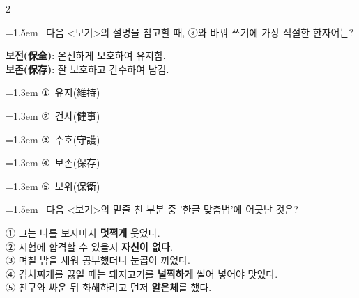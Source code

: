 \documentclass[10pt, a4paper]{article}
\begin{document}
\begin{multicols}{2}
\noindent\begin{minipage}{\columnwidth}
\vspace{2mm}
{\hangindent=1.5em  ~다음 <보기>의 설명을 참고할 때, ⓐ와 바꿔 쓰기에 가장 적절한 한자어는?\par}

\vspace{1mm}
\begin{boxibox}
\textbf{보전(保全)}: 온전하게 보호하여 유지함. \\
\textbf{보존(保存)}: 잘 보호하고 간수하여 남김. \\
\end{boxibox}
\vspace{1mm}

\vspace{0.5mm}
{\hangindent=1.3em  \noindent\hspace{0.3em}①~유지(維持)\par}
{\hangindent=1.3em  \noindent\hspace{0.3em}②~건사(健事)\par}
{\hangindent=1.3em  \noindent\hspace{0.3em}③~수호(守護)\par}
{\hangindent=1.3em  \noindent\hspace{0.3em}④~보존(保存)\par}
{\hangindent=1.3em  \noindent\hspace{0.3em}⑤~보위(保衛)\par}
\vspace{4mm}
\end{minipage}
\par

\noindent\begin{minipage}{\columnwidth}
\vspace{2mm}
{\hangindent=1.5em  ~다음 <보기>의 밑줄 친 부분 중 '한글 맞춤법'에 어긋난 것은?\par}

\vspace{1mm}
\begin{boxibox}
① 그는 나를 보자마자 \textbf{멋쩍게} 웃었다. \\
② 시험에 합격할 수 있을지 \textbf{자신이 없다}. \\
③ 며칠 밤을 새워 공부했더니 \textbf{눈곱}이 끼었다. \\
④ 김치찌개를 끓일 때는 돼지고기를 \textbf{널찍하게} 썰어 넣어야 맛있다. \\
⑤ 친구와 싸운 뒤 화해하려고 먼저 \textbf{알은체}를 했다. \\
\end{boxibox}
\vspace{1mm}


\end{minipage}
\end{multicols}
\end{document}
